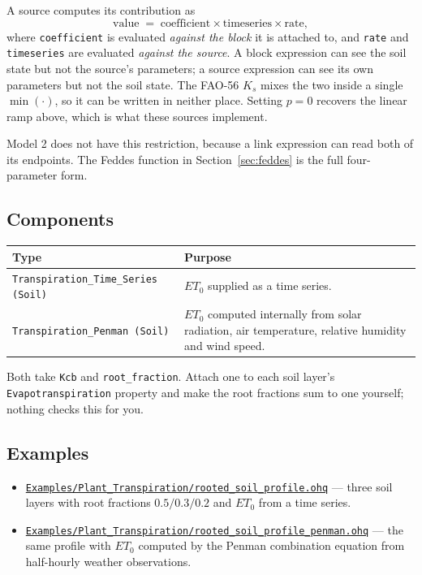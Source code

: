 \documentclass[11pt,a4paper]{article}
\newcommand{\code}[1]{\texttt{\small #1}}
\newcommand{\file}[1]{\texttt{\small #1}}
\newcommand{\ghbase}{https://github.com/ArashMassoudieh/OpenHydroQual/blob/master}
\newcommand{\exfile}[1]{\href{\ghbase/#1}{\file{#1}}}
\begin{document}
A source computes its contribution as
\[
  \text{value} \;=\; \text{coefficient} \times \text{timeseries} \times \text{rate},
\]
where \code{coefficient} is evaluated \emph{against the block} it is attached
to, and \code{rate} and \code{timeseries} are evaluated \emph{against the
source}. A block expression can see the soil state but not the source's
parameters; a source expression can see its own parameters but not the soil
state. The FAO-56 $K_s$ mixes the two inside a single $\min(\cdot)$, so it can
be written in neither place. Setting $p = 0$ recovers the linear ramp above,
which is what these sources implement.

Model 2 does not have this restriction, because a link expression can read both
of its endpoints. The Feddes function in Section~\ref{sec:feddes} is the full
four-parameter form.

\subsection{Components}

\begin{longtable}{@{}p{5.0cm}p{9.5cm}@{}}
\toprule
\textbf{Type} & \textbf{Purpose} \\
\midrule
\endhead
\code{Transpiration\_Time\_Series (Soil)} &
  $ET_0$ supplied as a time series. \\
\code{Transpiration\_Penman (Soil)} &
  $ET_0$ computed internally from solar radiation, air temperature, relative
  humidity and wind speed. \\
\bottomrule
\end{longtable}

\noindent
Both take \code{Kcb} and \code{root\_fraction}. Attach one to each soil layer's
\code{Evapotranspiration} property and make the root fractions sum to one
yourself; nothing checks this for you.

\subsection{Examples}

\begin{itemize}[leftmargin=1.4cm]
\item \exfile{Examples/Plant\_Transpiration/rooted\_soil\_profile.ohq} --- three
  soil layers with root fractions $0.5/0.3/0.2$ and $ET_0$ from a time series.
\item \exfile{Examples/Plant\_Transpiration/rooted\_soil\_profile\_penman.ohq}
  --- the same profile with $ET_0$ computed by the Penman combination equation
  from half-hourly weather observations.
\end{itemize}
\end{document}
